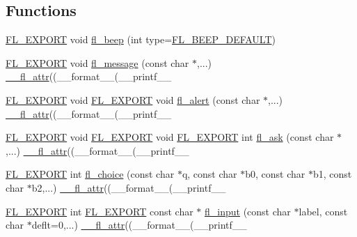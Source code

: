\subsection*{Functions}
\begin{DoxyCompactItemize}
\item 
\hyperlink{_fl___export_8_h_aa9ba29a18aee9d738370a06eeb4470fc}{F\+L\+\_\+\+E\+X\+P\+O\+RT} void \hyperlink{fl__ask_8_h_ae4ff3a9ea1901ccc58cd141569c60619}{fl\+\_\+beep} (int type=\hyperlink{fl__ask_8_h_af2427850080f7b2ddc65f9a0f1e2067cadf3a64f31aaf6ba0c6b93a45da955feb}{F\+L\+\_\+\+B\+E\+E\+P\+\_\+\+D\+E\+F\+A\+U\+LT})
\item 
\hyperlink{_fl___export_8_h_aa9ba29a18aee9d738370a06eeb4470fc}{F\+L\+\_\+\+E\+X\+P\+O\+RT} void \hyperlink{fl__ask_8_h_a39c7e2361ffcf61722c22aadbf2b96ab}{fl\+\_\+message} (const char $\ast$,...) \hyperlink{fl__ask_8_h_abd901bc7c322836b976d5ea9efc23258}{\+\_\+\+\_\+fl\+\_\+attr}((\+\_\+\+\_\+format\+\_\+\+\_\+(\+\_\+\+\_\+printf\+\_\+\+\_\+
\item 
\hyperlink{_fl___export_8_h_aa9ba29a18aee9d738370a06eeb4470fc}{F\+L\+\_\+\+E\+X\+P\+O\+RT} void \hyperlink{_fl___export_8_h_aa9ba29a18aee9d738370a06eeb4470fc}{F\+L\+\_\+\+E\+X\+P\+O\+RT} void \hyperlink{fl__ask_8_h_a44ce8540fd801b6adaaf5e499c2fc66e}{fl\+\_\+alert} (const char $\ast$,...) \hyperlink{fl__ask_8_h_abd901bc7c322836b976d5ea9efc23258}{\+\_\+\+\_\+fl\+\_\+attr}((\+\_\+\+\_\+format\+\_\+\+\_\+(\+\_\+\+\_\+printf\+\_\+\+\_\+
\item 
\hyperlink{_fl___export_8_h_aa9ba29a18aee9d738370a06eeb4470fc}{F\+L\+\_\+\+E\+X\+P\+O\+RT} void \hyperlink{_fl___export_8_h_aa9ba29a18aee9d738370a06eeb4470fc}{F\+L\+\_\+\+E\+X\+P\+O\+RT} void \hyperlink{_fl___export_8_h_aa9ba29a18aee9d738370a06eeb4470fc}{F\+L\+\_\+\+E\+X\+P\+O\+RT} int \hyperlink{fl__ask_8_h_a55f3def771c667e8c8f05c617bc410a2}{fl\+\_\+ask} (const char $\ast$,...) \hyperlink{fl__ask_8_h_abd901bc7c322836b976d5ea9efc23258}{\+\_\+\+\_\+fl\+\_\+attr}((\+\_\+\+\_\+format\+\_\+\+\_\+(\+\_\+\+\_\+printf\+\_\+\+\_\+
\item 
\hyperlink{_fl___export_8_h_aa9ba29a18aee9d738370a06eeb4470fc}{F\+L\+\_\+\+E\+X\+P\+O\+RT} int \hyperlink{fl__ask_8_h_a5b69d37ffa543fe5dd617dc4277f2e1c}{fl\+\_\+choice} (const char $\ast$q, const char $\ast$b0, const char $\ast$b1, const char $\ast$b2,...) \hyperlink{fl__ask_8_h_abd901bc7c322836b976d5ea9efc23258}{\+\_\+\+\_\+fl\+\_\+attr}((\+\_\+\+\_\+format\+\_\+\+\_\+(\+\_\+\+\_\+printf\+\_\+\+\_\+
\item 
\hyperlink{_fl___export_8_h_aa9ba29a18aee9d738370a06eeb4470fc}{F\+L\+\_\+\+E\+X\+P\+O\+RT} int \hyperlink{_fl___export_8_h_aa9ba29a18aee9d738370a06eeb4470fc}{F\+L\+\_\+\+E\+X\+P\+O\+RT} const char $\ast$ \hyperlink{fl__ask_8_h_ad235044a6890447148512cc147d15124}{fl\+\_\+input} (const char $\ast$label, const char $\ast$deflt=0,...) \hyperlink{fl__ask_8_h_abd901bc7c322836b976d5ea9efc23258}{\+\_\+\+\_\+fl\+\_\+attr}((\+\_\+\+\_\+format\+\_\+\+\_\+(\+\_\+\+\_\+printf\+\_\+\+\_\+

\end{DoxyCompactItemize}
